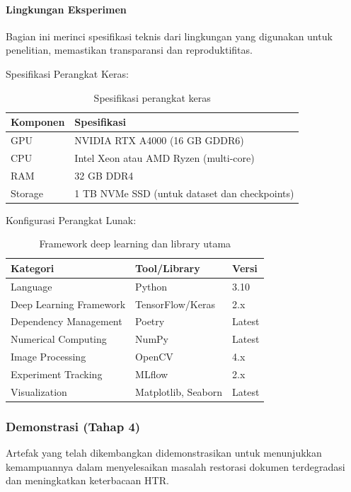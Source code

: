\documentclass[12pt,a4paper]{article}
\begin{document}
\paragraph{Lingkungan Eksperimen}
Bagian ini merinci spesifikasi teknis dari lingkungan yang digunakan untuk penelitian, memastikan transparansi dan reproduktifitas.

Spesifikasi Perangkat Keras:

\begin{table}[H]
\centering
\caption{Spesifikasi perangkat keras}
\label{tab:hardware-spec}
\small
\begin{tabular}{|l|l|}
\hline
\textbf{Komponen} & \textbf{Spesifikasi} \\ \hline
GPU & NVIDIA RTX A4000 (16 GB GDDR6) \\ \hline
CPU & Intel Xeon atau AMD Ryzen (multi-core) \\ \hline
RAM & 32 GB DDR4 \\ \hline
Storage & 1 TB NVMe SSD (untuk dataset dan checkpoints) \\ \hline
\end{tabular}
\end{table}

Konfigurasi Perangkat Lunak:

\begin{table}[H]
\centering
\caption{Framework deep learning dan library utama}
\label{tab:software-framework}
\small
\begin{tabular}{|l|l|l|}
\hline
\textbf{Kategori} & \textbf{Tool/Library} & \textbf{Versi} \\ \hline
Language & Python & 3.10 \\ \hline
Deep Learning Framework & TensorFlow/Keras & 2.x \\ \hline
Dependency Management & Poetry & Latest \\ \hline
Numerical Computing & NumPy & Latest \\ \hline
Image Processing & OpenCV & 4.x \\ \hline
Experiment Tracking & MLflow & 2.x \\ \hline
Visualization & Matplotlib, Seaborn & Latest \\ \hline
\end{tabular}
\end{table}

\subsubsection{Demonstrasi (Tahap 4)}
Artefak yang telah dikembangkan didemonstrasikan untuk menunjukkan kemampuannya dalam menyelesaikan masalah restorasi dokumen terdegradasi dan meningkatkan keterbacaan HTR.
\end{document}

